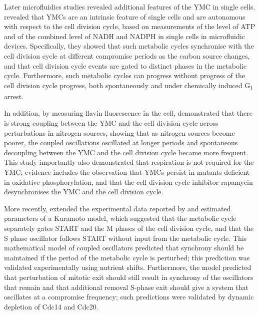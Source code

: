 Later microfluidics studies revealed additional features of the YMC in single cells.
\textcite{papagiannakisAutonomousMetabolicOscillations2017} revealed that YMCs are an intrinsic feature of single cells and are autonomous with respect to the cell division cycle, based on measurements of the  level of ATP and of the combined level of NADH and NADPH in single cells in microfluidic devices.
Specifically, they showed that such metabolic cycles synchronise with the cell division cycle at different compromise periods as the carbon source changes, and that cell division cycle events are gated to distinct phases in the metabolic cycle.
Furthermore, such metabolic cycles can progress without progress of the cell division cycle progress, both spontaneously and under chemically induced G\textsubscript{1} arrest.

In addition, by measuring flavin fluorescence in the cell, \textcite{baumgartnerFlavinbasedMetabolicCycles2018} demonstrated that there is strong coupling between the YMC and the cell division cycle across perturbations in nitrogen sources, showing that as nitrogen sources become poorer, the coupled oscillations oscillated at longer periods and spontaneous decoupling between the YMC and the cell division cycle became more frequent.
This study importantly also demonstrated that respiration is not required for the YMC\@; evidence includes the observation that YMCs persist in mutants deficient in oxidative phosphorylation, and that the cell division cycle inhibitor rapamycin desynchronises the YMC and the cell division cycle.

More recently, \textcite{ozsezenInferenceHighLevelInteraction2019} extended the experimental data reported by \textcite{papagiannakisAutonomousMetabolicOscillations2017} and estimated parameters of a Kuramoto model, which suggested that the metabolic cycle separately gates START and the M phases of the cell division cycle, and that the S phase oscillator follows START without input from the metabolic cycle.
This mathematical model of coupled oscillators predicted that synchrony should be maintained if the period of the metabolic cycle is perturbed; this prediction was validated experimentally using nutrient shifts.
Furthermore, the model predicted that perturbation of mitotic exit should still result in synchrony of the oscillators that remain and that additional removal S-phase exit should give a system that oscillates at a compromise frequency; such predictions were validated by dynamic depletion of Cdc14 and Cdc20.

